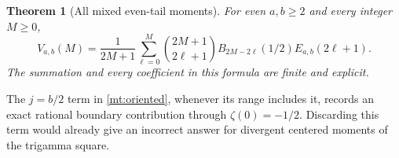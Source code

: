 \documentclass[11pt,letterpaper]{article}
\numberwithin{equation}{section}
\theoremstyle{plain}
\newtheorem{theorem}{Theorem}[section]
\theoremstyle{definition}
\theoremstyle{remark}
\begin{document}
\begin{theorem}[All mixed even-tail moments]
\label{mt:all-moments}
For even $a,b\ge2$ and every integer $M\ge0$,
\begin{equation}\label{mt:moment-formula}
 \boxed{\displaystyle
 V_{a,b}(M)=\frac1{2M+1}\sum_{\ell=0}^{M}
  \binom{2M+1}{2\ell+1}B_{2M-2\ell}(1/2)
                          E_{a,b}(2\ell+1).}
\end{equation}
The summation and every coefficient in this formula are finite and
explicit.
\end{theorem}

The $j=b/2$ term in \eqref{mt:oriented}, whenever its range includes
it, records an exact rational boundary contribution through
$\zeta(0)=-1/2$. Discarding this term would already give an incorrect
answer for divergent centered moments of the trigamma square.
\end{document}
